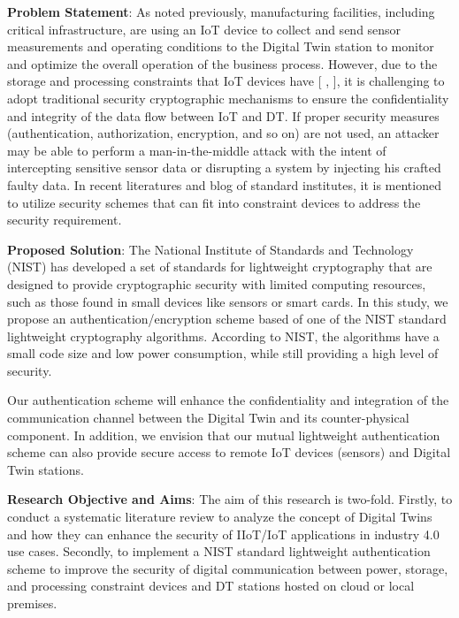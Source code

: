 \textbf{Problem Statement}:
As noted previously, manufacturing facilities, including critical infrastructure, are using an IoT device to collect and send sensor measurements and operating conditions to the Digital Twin station to monitor and optimize the overall operation of the business process. However, due to the storage and processing constraints that IoT devices have [ \cite{williams_survey_2022}, \cite{noauthor_lightweight_nodate}], it is challenging to adopt traditional security cryptographic mechanisms to ensure the confidentiality and integrity of the data flow between IoT and DT. If proper security measures (authentication, authorization, encryption, and so on) are not used, an attacker may be able to perform a man-in-the-middle attack with the intent of intercepting sensitive sensor data or disrupting a system by injecting his crafted faulty data\cite{salimBlockchainEnabledSecureDigital2022}. In recent literatures and blog of standard institutes, it is mentioned to utilize security schemes that can fit into constraint devices to address the security requirement.  

\textbf{Proposed Solution}:
The National Institute of Standards and Technology (NIST) has developed a set of standards for lightweight cryptography that are designed to provide cryptographic security with limited computing resources, such as those found in small devices like sensors or smart cards.
In this study, we propose an authentication/encryption scheme based of one of the NIST standard lightweight cryptography algorithms. According to NIST\cite{noauthor_lightweight_nodate}, the algorithms have a small code size and low power consumption, while still providing a high level of security.

 Our authentication scheme will enhance the confidentiality and integration of the communication channel between the Digital Twin and its counter-physical component. In addition, we envision that our mutual lightweight authentication scheme can also provide secure access to remote IoT devices (sensors) and  Digital Twin stations. 

\textbf{Research Objective and Aims}:
The aim of this research is two-fold. Firstly, to conduct a systematic literature review to analyze the concept of Digital Twins and how they can enhance the security of IIoT/IoT applications in industry 4.0 use cases. Secondly, to implement a NIST standard lightweight authentication scheme to improve the security of digital communication between power, storage, and processing constraint devices and DT stations hosted on cloud or local premises.


